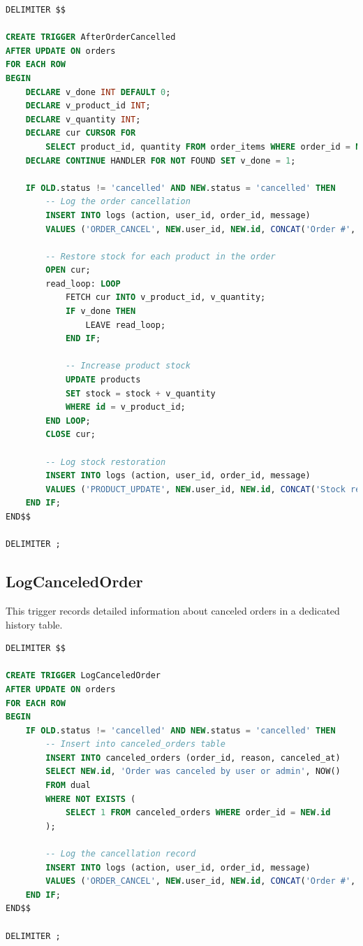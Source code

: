 \documentclass[14pt,a4paper]{article}
\begin{document}
\begin{lstlisting}[language=SQL, caption={AfterOrderCancelled Trigger}, label={lst:after-order-cancelled}]
DELIMITER $$

CREATE TRIGGER AfterOrderCancelled
AFTER UPDATE ON orders
FOR EACH ROW
BEGIN
    DECLARE v_done INT DEFAULT 0;
    DECLARE v_product_id INT;
    DECLARE v_quantity INT;
    DECLARE cur CURSOR FOR 
        SELECT product_id, quantity FROM order_items WHERE order_id = NEW.id;
    DECLARE CONTINUE HANDLER FOR NOT FOUND SET v_done = 1;

    IF OLD.status != 'cancelled' AND NEW.status = 'cancelled' THEN
        -- Log the order cancellation
        INSERT INTO logs (action, user_id, order_id, message)
        VALUES ('ORDER_CANCEL', NEW.user_id, NEW.id, CONCAT('Order #', NEW.id, ' canceled'));
        
        -- Restore stock for each product in the order
        OPEN cur;
        read_loop: LOOP
            FETCH cur INTO v_product_id, v_quantity;
            IF v_done THEN
                LEAVE read_loop;
            END IF;
            
            -- Increase product stock
            UPDATE products
            SET stock = stock + v_quantity
            WHERE id = v_product_id;
        END LOOP;
        CLOSE cur;
        
        -- Log stock restoration
        INSERT INTO logs (action, user_id, order_id, message)
        VALUES ('PRODUCT_UPDATE', NEW.user_id, NEW.id, CONCAT('Stock restored for order #', NEW.id));
    END IF;
END$$

DELIMITER ;
\end{lstlisting}

\subsection{LogCanceledOrder}

This trigger records detailed information about canceled orders in a dedicated history table.

\begin{lstlisting}[language=SQL, caption={LogCanceledOrder Trigger}, label={lst:log-canceled-order}]
DELIMITER $$

CREATE TRIGGER LogCanceledOrder
AFTER UPDATE ON orders
FOR EACH ROW
BEGIN
    IF OLD.status != 'cancelled' AND NEW.status = 'cancelled' THEN
        -- Insert into canceled_orders table
        INSERT INTO canceled_orders (order_id, reason, canceled_at)
        SELECT NEW.id, 'Order was canceled by user or admin', NOW()
        FROM dual
        WHERE NOT EXISTS (
            SELECT 1 FROM canceled_orders WHERE order_id = NEW.id
        );
        
        -- Log the cancellation record
        INSERT INTO logs (action, user_id, order_id, message)
        VALUES ('ORDER_CANCEL', NEW.user_id, NEW.id, CONCAT('Order #', NEW.id, ' cancellation recorded'));
    END IF;
END$$

DELIMITER ;
\end{lstlisting}
\end{document}
